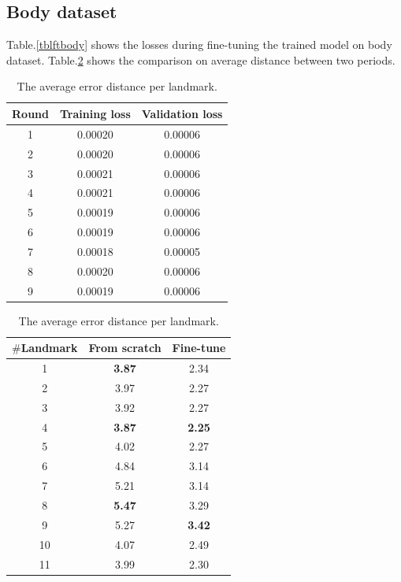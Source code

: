 \documentclass[12pt,a4paper]{article}
\begin{document}
\subsection{Body dataset}
Table.\ref{tblftbody} shows the losses during fine-tuning the trained model on body dataset. Table.\ref{tblcmpbody} shows the comparison on average distance between two periods.
\begin{table}[ht]
\begin{minipage}[b]{0.5\textwidth}
	\centering
	\begin{tabular}{c c c}
	Round & Training loss & Validation loss \\ \hline
	1 & 0.00020 & 0.00006  \\ \hline
	2 & 0.00020 & 0.00006 \\ \hline
	3 & 0.00021 & 0.00006 \\ \hline
	4 & 0.00021 & 0.00006 \\ \hline
	5 & 0.00019 & 0.00006 \\ \hline
	6 & 0.00019 & 0.00006 \\ \hline
	7 & 0.00018 & 0.00005 \\ \hline
	8 & 0.00020 & 0.00006 \\ \hline
	9 & 0.00019 & 0.00006 \\ \hline
	\end{tabular}
	\caption{The losses during fine-tuning model on body dataset}
	\label{tblftbody}
\end{minipage}
\hfill
\begin{minipage}[b]{0.5\textwidth}

\centering
\begin{tabular}[t]{|c|c|c|}
\hline
\textbf{$\#$Landmark} & \textbf{From scratch} & \textbf{Fine-tune} \\ \hline
1 & \textbf{3.87} & 2.34  \\ \hline
2 & 3.97 & 2.27  \\ \hline
3 & 3.92  & 2.27 \\ \hline
4 & \textbf{3.87}  & \textbf{2.25} \\ \hline
5 & 4.02  & 2.27 \\ \hline
6 & 4.84  & 3.14 \\ \hline
7 & 5.21  & 3.14 \\ \hline
8 & \textbf{5.47}  & 3.29 \\ \hline
9 & 5.27  & \textbf{3.42} \\ \hline
10 & 4.07  & 2.49 \\ \hline
11 & 3.99  & 2.30 \\ \hline
\end{tabular}
\caption{The average error distance per landmark.}
\label{tblcmpbody}

\end{minipage}
\end{table}
\end{document}
